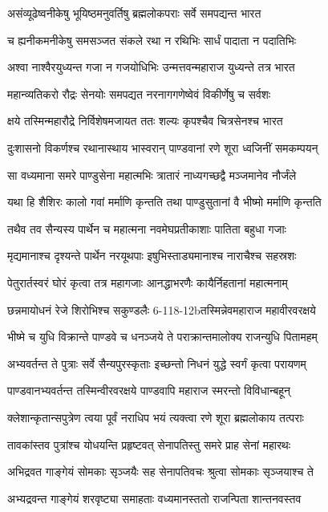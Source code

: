 \twolineshloka
{असंव्यूढेष्वनीकेषु भूयिष्ठमनुवर्तिषु}
{ब्रह्मलोकपराः सर्वे समपद्यन्त भारत}


\twolineshloka
{च ह्यनीकमनीकेषु समसञ्जत संकले}
{रथा न रथिभिः सार्धं पादाता न पदातिभिः}


\twolineshloka
{अश्वा नाश्वैरयुध्यन्त गजा न गजयोधिभिः}
{उन्मत्तवन्महाराज युध्यन्ते तत्र भारत}


\twolineshloka
{महान्व्यतिकरो रौद्रः सेनयोः समपद्यत}
{नरनागगणेष्वेवं विकीर्णेषु च सर्वशः}


\twolineshloka
{क्षये तस्मिन्महारौद्रे निर्विशेषमजायत}
{ततः शल्यः कृपश्चैव चित्रसेनश्च भारत}


\twolineshloka
{दुःशासनो विकर्णश्च रथानास्थाय भास्वरान्}
{पाण्डवानां रणे शूरा ध्वजिनीं समकम्पयन्}


\twolineshloka
{सा वध्यमाना समरे पाण्डुसेना महात्मभिः}
{त्रातारं नाध्यगच्छद्वै मञ्जमानेव नौर्जंले}


\twolineshloka
{यथा हि शैशिरः कालो गवां मर्माणि कृन्तति}
{तथा पाण्डुसुतानां वै भीष्मो मर्माणि कृन्तति}


\twolineshloka
{तथैव तव सैन्यस्य पार्थेन च महात्मना}
{नवमेघप्रतीकाशाः पातिता बहुधा गजाः}


\twolineshloka
{मृद्यमानाश्च दृश्यन्ते पार्थेन नरयूथपाः}
{इषुभिस्ताड्यमानाश्च नाराचैश्च सहस्रशः}


\twolineshloka
{पेतुरार्तस्वरं घोरं कृत्वा तत्र महागजाः}
{आनद्धाभरणैः कायैर्निहतानां महात्मनाम्}


\twolineshloka
{छन्नमायोधनं रेजे शिरोभिश्च सकुण्डलैः}
{6-118-12bतस्मिन्नेवमहाराज महावीरवरक्षये}


\twolineshloka
{भीष्मे च युधि विक्रान्ते पाण्डवे च धनञ्जये}
{ते पराक्रान्तमालोक्य राजन्युधि पितामहम्}


\twolineshloka
{अभ्यवर्तन्त ते पुत्राः सर्वे सैन्यपुरस्कृताः}
{इच्छन्तो निधनं युद्धे स्वर्गं कृत्वा परायणम्}


\twolineshloka
{पाण्डवानभ्यवर्तन्त तस्मिन्वीरवरक्षये}
{पाण्डवापि महाराज स्मरन्तो विविधान्बहून्}


\twolineshloka
{क्लेशान्कृतान्सपुत्रेण त्वया पूर्वं नराधिप}
{भयं त्यक्त्वा रणे शूरा ब्रह्मलोकाय तत्पराः}


\twolineshloka
{तावकांस्तव पुत्रांश्च योधयन्ति प्रहृष्टवत्}
{सेनापतिस्तु समरे प्राह सेनां महारथः}


\twolineshloka
{अभिद्रवत गाङ्गेयं सोमकाः सृञ्जयैः सह}
{सेनापतिवचः श्रुत्वा सोमकाः सृञ्जयाश्च ते}


\twolineshloka
{अभ्यद्रवन्त गाङ्गेयं शरवृष्ट्या समाहताः}
{वध्यमानस्ततो राजन्पिता शान्तनवस्तव}


